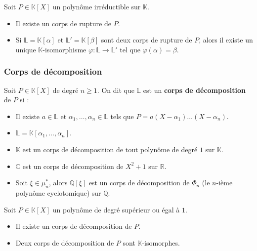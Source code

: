   \begin{theorem}
    Soit $P \in \mathbb{K}[X]$ un polynôme irréductible sur $\mathbb{K}$.
    \begin{itemize}
      \item Il existe un corps de rupture de $P$.
      \item Si $\mathbb{L} = \mathbb{K}[\alpha]$ et $\mathbb{L}' = \mathbb{K}[\beta]$ sont deux corps de rupture de $P$, alors il existe un unique $\mathbb{K}$-isomorphisme $\varphi : \mathbb{L} \rightarrow \mathbb{L}'$ tel que $\varphi(\alpha) = \beta$.
    \end{itemize}
  \end{theorem}
  
  \subsubsection{Corps de décomposition}

  \begin{definition}
    Soit $P \in \mathbb{K}[X]$ de degré $n \geq 1$. On dit que $\mathbb{L}$ est un \textbf{corps de décomposition} de $P$ si :
    \begin{itemize}
      \item Il existe $a \in \mathbb{L}$ et $\alpha_1, \dots, \alpha_n \in \mathbb{L}$ tels que $P = a(X-\alpha_1) \dots (X-\alpha_n)$.
      \item $\mathbb{L} = \mathbb{K}[\alpha_1, \dots, \alpha_n]$.
    \end{itemize}
  \end{definition}

  \begin{example}
    \begin{itemize}
      \item $\mathbb{K}$ est un corps de décomposition de tout polynôme de degré $1$ sur $\mathbb{K}$.
      \item $\mathbb{C}$ est un corps de décomposition de $X^2+1$ sur $\mathbb{R}$.
      \item Soit $\xi \in \mu_n^*$, alors $\mathbb{Q}[\xi]$ est un corps de décomposition de $\Phi_n$ (le $n$-ième polynôme cyclotomique) sur $\mathbb{Q}$.
    \end{itemize}
  \end{example}

  \begin{theorem}
    Soit $P \in \mathbb{K}[X]$ un polynôme de degré supérieur ou égal à $1$.
    \begin{itemize}
      \item Il existe un corps de décomposition de $P$.
      \item Deux corps de décomposition de $P$ sont $\mathbb{K}$-isomorphes.
    \end{itemize}
  \end{theorem}
  
